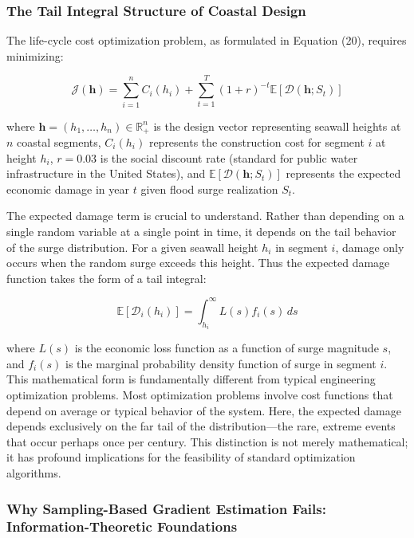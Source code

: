 \documentclass[review]{elsarticle}
\begin{document}
\subsubsection{The Tail Integral Structure of Coastal Design}

The life-cycle cost optimization problem, as formulated in Equation (20), requires minimizing:

\begin{equation}
\mathcal{J}(\mathbf{h}) = \sum_{i=1}^{n} C_i(h_i) + \sum_{t=1}^{T} (1+r)^{-t} \mathbb{E}[\mathcal{D}(\mathbf{h}; S_t)]
\label{eq:lcc_objective}
\end{equation}

where $\mathbf{h} = (h_1, \ldots, h_n) \in \mathbb{R}_+^n$ is the design vector representing seawall heights at $n$ coastal segments, $C_i(h_i)$ represents the construction cost for segment $i$ at height $h_i$, $r = 0.03$ is the social discount rate (standard for public water infrastructure in the United States), and $\mathbb{E}[\mathcal{D}(\mathbf{h}; S_t)]$ represents the expected economic damage in year $t$ given flood surge realization $S_t$.

The expected damage term is crucial to understand. Rather than depending on a single random variable at a single point in time, it depends on the tail behavior of the surge distribution. For a given seawall height $h_i$ in segment $i$, damage only occurs when the random surge exceeds this height. Thus the expected damage function takes the form of a tail integral:

\begin{equation}
\mathbb{E}[\mathcal{D}_i(h_i)] = \int_{h_i}^{\infty} L(s) f_i(s) \, ds
\label{eq:tail_integral}
\end{equation}

where $L(s)$ is the economic loss function as a function of surge magnitude $s$, and $f_i(s)$ is the marginal probability density function of surge in segment $i$. This mathematical form is fundamentally different from typical engineering optimization problems. Most optimization problems involve cost functions that depend on average or typical behavior of the system. Here, the expected damage depends exclusively on the far tail of the distribution---the rare, extreme events that occur perhaps once per century. This distinction is not merely mathematical; it has profound implications for the feasibility of standard optimization algorithms.

\subsubsection{Why Sampling-Based Gradient Estimation Fails: Information-Theoretic Foundations}
\end{document}

